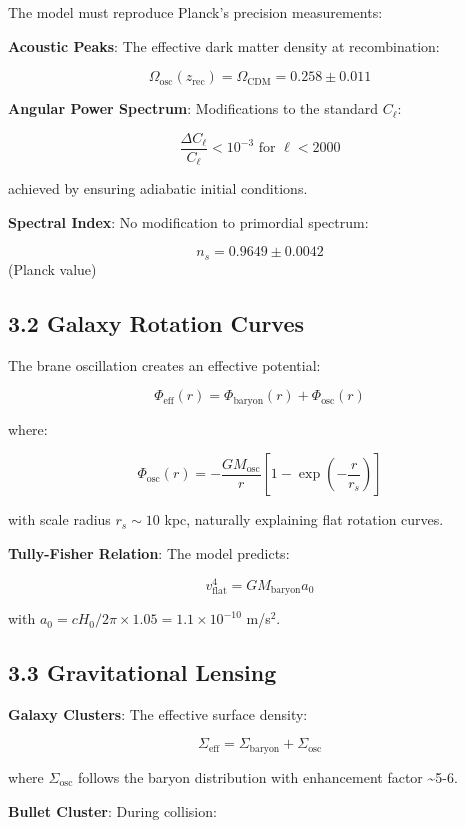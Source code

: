 \documentclass[
  11pt,
]{report}
\begin{document}
The model must reproduce Planck's precision measurements:

\textbf{Acoustic Peaks}: The effective dark matter density at
recombination:

\[\Omega_\text{osc}(z_\text{rec}) = \Omega_\text{CDM} = 0.258 \pm 0.011\]

\textbf{Angular Power Spectrum}: Modifications to the standard
\(C_\ell\):

\[\frac{\Delta C_\ell}{C_\ell} < 10^{-3} \text{ for } \ell < 2000\]

achieved by ensuring adiabatic initial conditions.

\textbf{Spectral Index}: No modification to primordial spectrum:

\[n_s = 0.9649 \pm 0.0042\] (Planck value)

\subsection{3.2 Galaxy Rotation Curves}\label{galaxy-rotation-curves}

The brane oscillation creates an effective potential:

\[\Phi_\text{eff}(r) = \Phi_\text{baryon}(r) + \Phi_\text{osc}(r)\]

where:

\[\Phi_\text{osc}(r) = -\frac{GM_\text{osc}}{r} \left[1 - \exp\left(-\frac{r}{r_s}\right)\right]\]

with scale radius \(r_s \sim 10\) kpc, naturally explaining flat
rotation curves.

\textbf{Tully-Fisher Relation}: The model predicts:

\[v_\text{flat}^4 = G M_\text{baryon} a_0\]

with \(a_0 = cH_0/2\pi \times 1.05 = 1.1 \times 10^{-10}\) m/s\(^2\).

\subsection{3.3 Gravitational Lensing}\label{gravitational-lensing}

\textbf{Galaxy Clusters}: The effective surface density:

\[\Sigma_\text{eff} = \Sigma_\text{baryon} + \Sigma_\text{osc}\]

where \(\Sigma_\text{osc}\) follows the baryon distribution with
enhancement factor \textasciitilde5-6.

\textbf{Bullet Cluster}: During collision:
\end{document}
